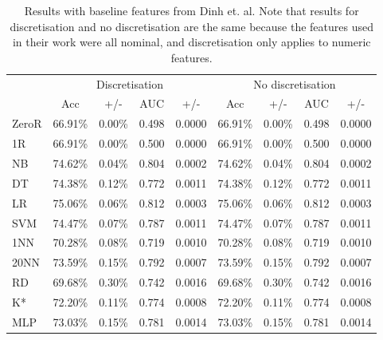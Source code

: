\begin{table}[htbp]
\caption{Results with baseline features from Dinh et. al. Note that results
for discretisation and no discretisation are the same because the features
used in their work were all nominal, and discretisation only applies to
numeric features.}
\begin{tabular}{|l|cccc|cccc|}
\hline
 & \multicolumn{ 4}{c|}{Discretisation} & \multicolumn{ 4}{c|}{No discretisation} \\
  & Acc & +/- & AUC & +/- & Acc & +/- & AUC & +/- \\ \hline
  ZeroR & 66.91\% & 0.00\% & 0.498 & 0.0000 & 66.91\% & 0.00\% & 0.498 & 0.0000 \\ 
  1R & 66.91\% & 0.00\% & 0.500 & 0.0000 & 66.91\% & 0.00\% & 0.500 & 0.0000 \\ 
  NB & 74.62\% & 0.04\% & 0.804 & 0.0002 & 74.62\% & 0.04\% & 0.804 & 0.0002 \\ 
  DT & 74.38\% & 0.12\% & 0.772 & 0.0011 & 74.38\% & 0.12\% & 0.772 & 0.0011 \\ 
  LR & 75.06\% & 0.06\% & 0.812 & 0.0003 & 75.06\% & 0.06\% & 0.812 & 0.0003 \\ 
  SVM & 74.47\% & 0.07\% & 0.787 & 0.0011 & 74.47\% & 0.07\% & 0.787 & 0.0011 \\ 
  1NN & 70.28\% & 0.08\% & 0.719 & 0.0010 & 70.28\% & 0.08\% & 0.719 & 0.0010 \\ 
  20NN & 73.59\% & 0.15\% & 0.792 & 0.0007 & 73.59\% & 0.15\% & 0.792 & 0.0007 \\ 
  RD & 69.68\% & 0.30\% & 0.742 & 0.0016 & 69.68\% & 0.30\% & 0.742 & 0.0016 \\ 
  K* & 72.20\% & 0.11\% & 0.774 & 0.0008 & 72.20\% & 0.11\% & 0.774 & 0.0008 \\ 
  MLP & 73.03\% & 0.15\% & 0.781 & 0.0014 & 73.03\% & 0.15\% & 0.781 & 0.0014 \\ \hline
\end{tabular}
\label{}
\end{table}
